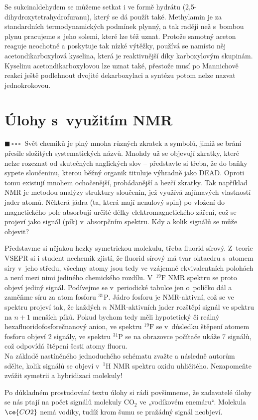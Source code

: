 \documentclass{book}
\newcommand{\jeden}{$\blacksquare \, \square \, \square \, \square \; \; $}
\renewenvironment{quotation}{\par}{\par} %
\begin{document}
Se sukcinaldehydem se můžeme setkat i ve formě hydrátu (2,5-dihydroxytetra\-hydrofuranu),
který se dá použít také. Methylamin je za standardních termodynamických
podmínek plynný, a tak raději než s~bombou plynu pracujeme s~jeho solemi,
které lze též uznat. Protože samotný aceton reaguje neochotně a poskytuje
tak nízké výtěžky, používá se namísto něj acetondikarboxylová kyselina,
která je reaktivnější díky karboxylovým skupinám. Kyselinu acetondikarboxylovou
lze uznat také, přestože musí po Mannichově reakci ještě podlehnout
dvojité dekarboxylaci a syntézu potom nelze nazvat jednokrokovou.

\section{Úlohy s~využitím NMR}

\begin{quotation}
\jeden Svět chemiků je plný mnoha různých zkratek a symbolů, jimiž se brání
přesile složitých systematických názvů. Mnohdy už se objevují zkratky,
které nelze rozeznat od skutečných anglických slov -- představte
si třeba, že do baňky sypete sloučeninu, kterou běžný organik tituluje
výhradně jako DEAD. Oproti tomu existují mnohem ochočenější, probádanější
a hezčí zkratky. Tak například NMR je metodou analýzy struktury sloučenin,
jež využívá zajímavých vlastností jader atomů. Některá jádra (ta,
která mají nenulový spin) po vložení do magnetického pole absorbují
určité délky elektromagnetického záření, což se projeví jako signál
(pík) v~absorpčním spektru. Kdy a kolik signálů se může objevit? 

Představme si nějakou hezky symetrickou molekulu, třeba fluorid sírový.
Z~teorie VSEPR si i student nechemik zjistí, že fluorid sírový má
tvar oktaedru s~atomem síry v~jeho středu, všechny atomy jsou tedy
ve vzájemně ekvivalentních polohách a není mezi nimi jediného chemického
rozdílu. V~$\mathrm{^{19}F}$ NMR spektru se proto objeví jediný signál.
Podívejme se v~periodické tabulce jen o~políčko dál a zaměňme síru
za atom fosforu $\mathrm{^{31}P}$. Jádro fosforu je NMR-aktivní,
což se ve spektru projeví tak, že každých $n$ NMR-aktivních jader rozštěpí
signál ve spektru na $n+1$ menších píků. Pokud bychom tedy měli hypotetický
či reálný hexafluoridofosforečnanový anion, ve spektru $\mathrm{^{19}F}$
se v~důsledku štěpení atomem fosforu objeví 2 signály, ve spektru
$\mathrm{^{31}P}$ se na obrazovce počítače ukáže 7 signálů, což odpovídá
štěpení šesti atomy fluoru.\\Na základě nastíněného jednoduchého schématu
zvažte a následně autorům sdělte, kolik signálů se objeví v~$\mathrm{^{1}H}$
NMR spektru oxidu uhličitého. Nezapomeňte zvážit symetrii a hybridizaci
molekuly! 
\end{quotation} \dotfill \par 
Po důkladném prostudování textu úlohy si rádi povšimneme,
že zadavatelé úlohy se nás ptají na počet signálů molekuly $\mathrm{CO_{2}}$
ve „vodíkovém enemáru“. Molekula $\ce{CO2}$ nemá vodíky, tudíž krom šumu
se pražádný signál neobjeví. 
\end{document}
